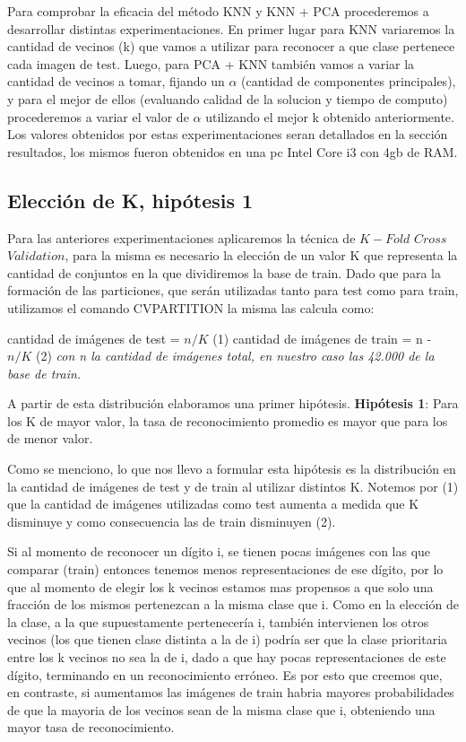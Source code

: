 \newpage


Para comprobar la eficacia del método KNN y KNN + PCA procederemos a desarrollar distintas experimentaciones. En primer lugar para KNN variaremos la cantidad de vecinos (k) que vamos a utilizar para reconocer a que clase pertenece cada imagen de test. Luego, para PCA + KNN también vamos a variar la cantidad de vecinos a tomar, fijando un $\alpha$ (cantidad de componentes principales),  y para el mejor de ellos (evaluando calidad de la solucion y tiempo de computo) procederemos a variar el valor de $\alpha$ utilizando el mejor k obtenido  anteriormente. Los valores obtenidos por estas experimentaciones seran detallados en la sección resultados, los mismos fueron obtenidos en una pc Intel Core i3 con 4gb de RAM.\newline

\subsection{Elección de K, hipótesis 1}


 Para las anteriores experimentaciones aplicaremos la técnica de $K-Fold$ $Cross$ $Validation$, para la misma es necesario la elección de un valor K que representa la cantidad de conjuntos en la que dividiremos la base de train. Dado que para la formación de las particiones, que serán utilizadas tanto para test como para train, utilizamos el comando CVPARTITION la misma las calcula como:\newline
 
 cantidad de imágenes de test = $n/K$  (1)\newline
  cantidad de imágenes de train = n - $n/K$ (2)\newline
  \textit{con n la cantidad de imágenes total, en nuestro caso las 42.000 de la base de train.}
  
A partir de esta distribución elaboramos una primer hipótesis. 
 \textbf{Hipótesis 1}: Para los K de mayor valor, la tasa de reconocimiento promedio es mayor que para los de menor valor.  
 
 Como se menciono, lo que nos llevo a formular esta hipótesis es la distribución en la cantidad de imágenes de test y de train al utilizar distintos K. Notemos por (1) que la cantidad de imágenes utilizadas como test aumenta a medida que K disminuye y como consecuencia las de train disminuyen (2). 
 
Si al momento de reconocer un dígito i, se tienen pocas imágenes con las que comparar (train) entonces tenemos menos representaciones de ese dígito, por lo que al momento de elegir los k vecinos estamos mas propensos a que solo una fracción de los mismos pertenezcan a la misma clase que i. Como en la elección de la clase, a la que supuestamente pertenecería i, también intervienen los otros vecinos (los que tienen clase distinta a la de i) podría ser que la clase prioritaria entre los k vecinos no sea la de i, dado a que hay pocas representaciones de este dígito, terminando en un reconocimiento erróneo. Es por esto que creemos que, en contraste, si aumentamos las imágenes de train habria mayores probabilidades de que la mayoria de los vecinos sean de la misma clase que i, obteniendo una mayor tasa de reconocimiento. 

